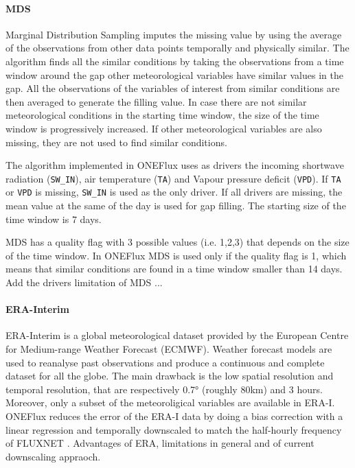 \documentclass{article}
\begin{document}
\paragraph{MDS} Marginal Distribution Sampling \cite{reichstein_separation_2005-3} imputes the missing value by using the average of the observations from other data points temporally and physically similar. 
The algorithm finds all the similar conditions by taking the observations from a time window around the gap other meteorological variables have similar values in the gap.
All the observations of the variables of interest from similar conditions are then averaged to generate the filling value.
In case there are not similar meteorological conditions in the starting time window, the size of the time window is progressively increased. If other meteorological variables are also missing, they are not used to find similar conditions.

The algorithm implemented in ONEFlux uses as drivers the incoming shortwave radiation (\texttt{SW\_IN}), air temperature (\texttt{TA}) and Vapour pressure deficit (\texttt{VPD}). If \texttt{TA} or \texttt{VPD} is missing, \texttt{SW\_IN} is used as the only driver. If all drivers are missing, the mean value at the same of the day is used for gap filling. The starting size of the time window is 7 days.

MDS has a quality flag with 3 possible values (i.e. 1,2,3) that depends on the size of the time window. In ONEFlux MDS is used only if the quality flag is 1, which means that similar conditions are found in a time window smaller than 14 days. Add the drivers
limitation of MDS ...

\paragraph{ERA-Interim} ERA-Interim is a global meteorological dataset provided by the European Centre for Medium-range Weather Forecast (ECMWF). Weather forecast models are used to reanalyse past observations and produce a continuous and complete dataset for all the globe. The main drawback is the low spatial resolution and temporal resolution, that are respectively 0.7° (roughly 80\si{km}) and 3 hours. Moreover, only a subset of the meteoroligical variables are available in ERA-I. ONEFlux reduces the error of the ERA-I data by doing a bias correction with a linear regression and temporally downscaled to match the half-hourly frequency of FLUXNET \cite{vuichard_filling_2015}. 
Advantages of ERA, limitations in general and of current downscaling appraoch.
\end{document}
